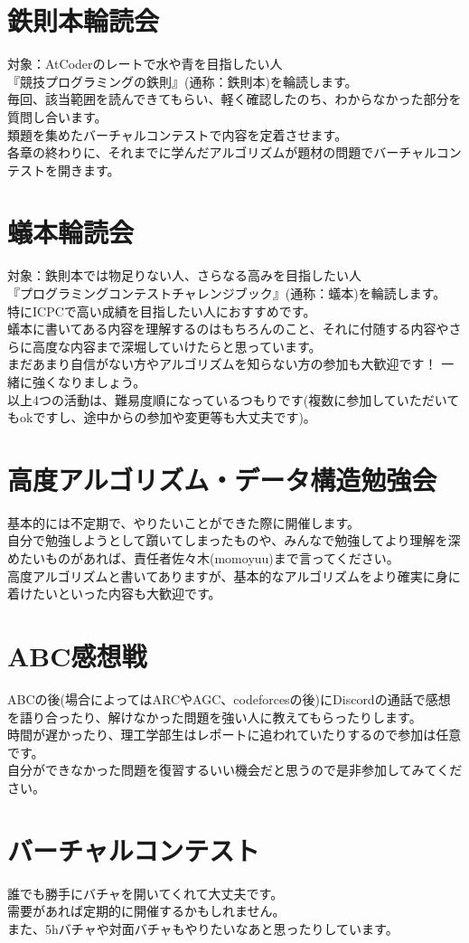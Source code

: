 \documentclass[a4paper, landscape]{jsarticle}
\begin{document}
\section{鉄則本輪読会}
\noindent
対象：AtCoderのレートで水や青を目指したい人\\
\indent
『競技プログラミングの鉄則』(通称：鉄則本)を輪読します。\\
毎回、該当範囲を読んできてもらい、軽く確認したのち、わからなかった部分を質問し合います。\\
類題を集めたバーチャルコンテストで内容を定着させます。\\
各章の終わりに、それまでに学んだアルゴリズムが題材の問題でバーチャルコンテストを開きます。

\section{蟻本輪読会}
\noindent
対象：鉄則本では物足りない人、さらなる高みを目指したい人 \\
\indent
『プログラミングコンテストチャレンジブック』(通称：蟻本)を輪読します。\\
特にICPCで高い成績を目指したい人におすすめです。\\
蟻本に書いてある内容を理解するのはもちろんのこと、それに付随する内容やさらに高度な内容まで深堀していけたらと思っています。\\
まだあまり自信がない方やアルゴリズムを知らない方の参加も大歓迎です！
一緒に強くなりましょう。
\\

以上4つの活動は、難易度順になっているつもりです(複数に参加していただいてもokですし、途中からの参加や変更等も大丈夫です)。
\\

\section{高度アルゴリズム・データ構造勉強会}
基本的には不定期で、やりたいことができた際に開催します。\\
自分で勉強しようとして躓いてしまったものや、みんなで勉強してより理解を深めたいものがあれば、責任者佐々木(momoyuu)まで言ってください。\\
高度アルゴリズムと書いてありますが、基本的なアルゴリズムをより確実に身に着けたいといった内容も大歓迎です。

\section{ABC感想戦}
ABCの後(場合によってはARCやAGC、codeforcesの後)にDiscordの通話で感想を語り合ったり、解けなかった問題を強い人に教えてもらったりします。\\
時間が遅かったり、理工学部生はレポートに追われていたりするので参加は任意です。\\
自分ができなかった問題を復習するいい機会だと思うので是非参加してみてください。

\section{バーチャルコンテスト}
誰でも勝手にバチャを開いてくれて大丈夫です。\\
需要があれば定期的に開催するかもしれません。\\
また、5hバチャや対面バチャもやりたいなあと思ったりしています。\\
\end{document}
